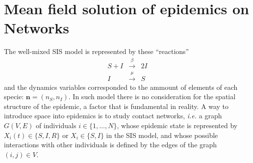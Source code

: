 \chapter{Mean field solution of epidemics on Networks}


The well-mixed SIS model is represented by these ``reactions''
\begin{eqnarray*}
 S + I &\xrightarrow{\beta}& 2I \\
 I &\xrightarrow{\mu}& S  
\end{eqnarray*}
and the dynamics variables corresponded to the ammount of elements of each specie: $\bm{n} = (n_S,n_I)$. 
In such model there is no consideration for the spatial structure of the epidemic, a factor that is fundamental in reality. A way to introduce space into epidemics is to study contact networks, {\it i.e.} a graph $G(V,E)$ of individuals $i \in \{1,\ldots,N\}$, whose epidemic state is represented by $X_i(t) \in \{S,I,R\}$ or $X_i \in \{S,I\}$ in the SIS model, and whose possible interactions with other individuals is defined by the edges of the graph $(i,j)\in V$.

